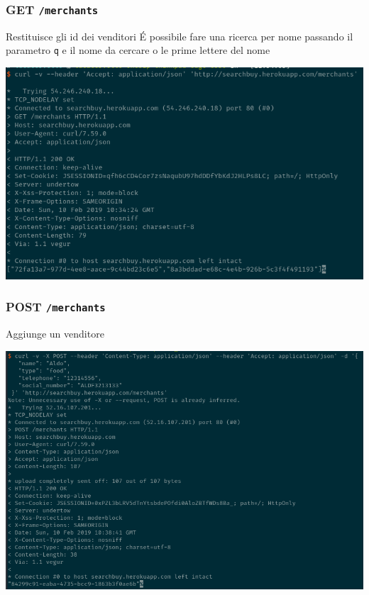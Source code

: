 \documentclass[11pt]{article}
\begin{document}
\subsubsection{GET \texttt{/merchants}}
\label{sec:org2a42432}
Restituisce gli id dei venditori
É possibile fare una ricerca per nome passando il parametro \texttt{q} e il nome da cercare o le prime lettere del nome
\begin{center}
\includegraphics[width=.9\linewidth]{img/merchants-screen/get-merchants.png}
\end{center}
\subsubsection{POST \texttt{/merchants}}
\label{sec:org4ed0fe2}
Aggiunge un venditore
\begin{center}
\includegraphics[width=.9\linewidth]{img/merchants-screen/post-merchants.png}
\end{center}
\end{document}
